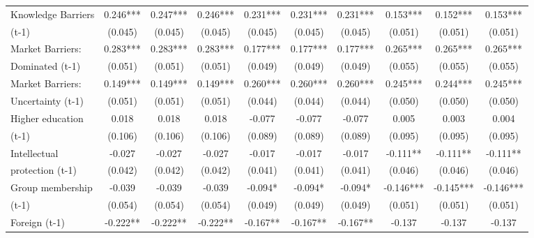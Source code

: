 \begin{table}[htbp]
\begin{tabular}{l*{9}{c}}
Knowledge Barriers  &       0.246***&       0.247***&       0.246***&       0.231***&       0.231***&       0.231***&       0.153***&       0.152***&       0.153***\\
(t-1)               &     (0.045)   &     (0.045)   &     (0.045)   &     (0.045)   &     (0.045)   &     (0.045)   &     (0.051)   &     (0.051)   &     (0.051)   \\
Market Barriers:    &       0.283***&       0.283***&       0.283***&       0.177***&       0.177***&       0.177***&       0.265***&       0.265***&       0.265***\\
Dominated (t-1)     &     (0.051)   &     (0.051)   &     (0.051)   &     (0.049)   &     (0.049)   &     (0.049)   &     (0.055)   &     (0.055)   &     (0.055)   \\
Market Barriers:    &       0.149***&       0.149***&       0.149***&       0.260***&       0.260***&       0.260***&       0.245***&       0.244***&       0.245***\\
Uncertainty (t-1)   &     (0.051)   &     (0.051)   &     (0.051)   &     (0.044)   &     (0.044)   &     (0.044)   &     (0.050)   &     (0.050)   &     (0.050)   \\
Higher education    &       0.018   &       0.018   &       0.018   &      -0.077   &      -0.077   &      -0.077   &       0.005   &       0.003   &       0.004   \\
(t-1)               &     (0.106)   &     (0.106)   &     (0.106)   &     (0.089)   &     (0.089)   &     (0.089)   &     (0.095)   &     (0.095)   &     (0.095)   \\
Intellectual        &      -0.027   &      -0.027   &      -0.027   &      -0.017   &      -0.017   &      -0.017   &      -0.111** &      -0.111** &      -0.111** \\
protection (t-1)    &     (0.042)   &     (0.042)   &     (0.042)   &     (0.041)   &     (0.041)   &     (0.041)   &     (0.046)   &     (0.046)   &     (0.046)   \\
Group membership    &      -0.039   &      -0.039   &      -0.039   &      -0.094*  &      -0.094*  &      -0.094*  &      -0.146***&      -0.145***&      -0.146***\\
(t-1)               &     (0.054)   &     (0.054)   &     (0.054)   &     (0.049)   &     (0.049)   &     (0.049)   &     (0.051)   &     (0.051)   &     (0.051)   \\
Foreign (t-1)       &      -0.222** &      -0.222** &      -0.222** &      -0.167** &      -0.167** &      -0.167** &      -0.137   &      -0.137   &      -0.137   \\

\end{tabular}
\end{table}
